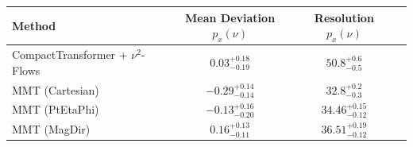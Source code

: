     \begin{tabular}{lccc}
        \toprule
        Method & Mean Deviation $p_{x}(\nu)$ & Resolution $p_{x}(\nu)$ \\
        \midrule
        CompactTransformer + $\nu^2$-Flows & $0.03^{+0.18}_{-0.19}$ & $50.8^{+0.6}_{-0.5}$ \\
        MMT (Cartesian) & $-0.29^{+0.14}_{-0.14}$ & $32.8^{+0.2}_{-0.3}$ \\
        MMT (PtEtaPhi) & $-0.13^{+0.16}_{-0.20}$ & $34.46^{+0.15}_{-0.12}$ \\
        MMT (MagDir) & $0.16^{+0.13}_{-0.11}$ & $36.51^{+0.19}_{-0.12}$ \\
        \bottomrule
    \end{tabular}